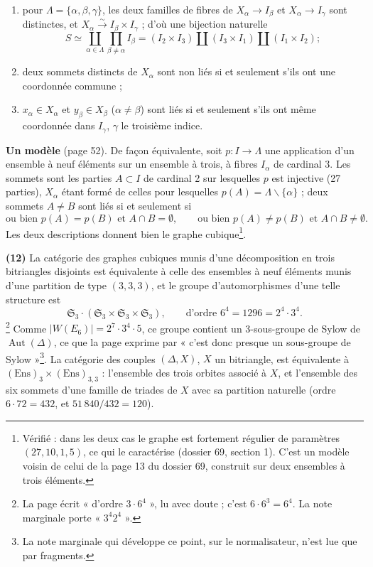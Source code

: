 \documentclass[11pt,a4paper]{article}
\begin{document}
\begin{enumerate}
\item[a)] pour $\Lambda = \lbrace \alpha, \beta, \gamma\rbrace$, les deux familles
  de fibres de $X_\alpha \to I_\beta$ et $X_\alpha \to I_\gamma$ sont distinctes,
  et $X_\alpha \xrightarrow{\sim} I_\beta \times I_\gamma$ ; d'où une bijection
  naturelle
  \[
  S \simeq \coprod_{\alpha \in \Lambda} \prod_{\beta \neq \alpha} I_\beta =
  (I_2 \times I_3) \amalg (I_3 \times I_1) \amalg (I_1 \times I_2) ;
  \]
\item[c)] deux sommets distincts de $X_\alpha$ sont non liés si et seulement
  s'ils ont une coordonnée commune ;
\item[d)] $x_\alpha \in X_\alpha$ et $y_\beta \in X_\beta$ ($\alpha \neq \beta$)
  sont liés si et seulement s'ils ont même coordonnée dans $I_\gamma$, $\gamma$
  le troisième indice.
\end{enumerate}

\textbf{Un modèle} (page 52). De façon équivalente, soit $p : I \to \Lambda$
une application d'un ensemble à neuf éléments sur un ensemble à trois, à fibres
$I_\alpha$ de cardinal 3. Les sommets sont les parties $A \subset I$ de
cardinal 2 sur lesquelles $p$ est injective (27 parties), $X_\alpha$ étant
formé de celles pour lesquelles $p(A) = \Lambda \smallsetminus \lbrace
\alpha\rbrace$ ; deux sommets $A \neq B$ sont liés si et seulement si
\[
\text{ou bien } p(A) = p(B) \text{ et } A \cap B = \emptyset, \qquad \text{ou
bien } p(A) \neq p(B) \text{ et } A \cap B \neq \emptyset .
\]
Les deux descriptions donnent bien le graphe cubique\footnote{Vérifié : dans
les deux cas le graphe est fortement régulier de paramètres $(27, 10, 1, 5)$, ce
qui le caractérise (dossier 69, section 1). C'est un modèle voisin de celui de
la page 13 du dossier 69, construit sur deux ensembles à trois éléments.}.

\textbf{(12)} La catégorie des graphes cubiques munis d'une décomposition en
trois bitriangles disjoints est équivalente à celle des ensembles à neuf
éléments munis d'une partition de type $(3, 3, 3)$, et le groupe
d'automorphismes d'une telle structure est
\[
\mathfrak{S}_3 \cdot (\mathfrak{S}_3 \times \mathfrak{S}_3 \times
\mathfrak{S}_3), \qquad \text{d'ordre } 6^4 = 1296 = 2^4 \cdot 3^4 .
\]\footnote{La page
écrit « d'ordre $3 \cdot 6^4$ », lu avec doute ; c'est $6 \cdot 6^3 = 6^4$. La
note marginale porte « $3^4 2^4$ ».}
Comme $|W(E_6)| = 2^7 \cdot 3^4 \cdot 5$, ce groupe contient un 3-sous-groupe
de Sylow de $\operatorname{Aut}(\Delta)$, ce que la page exprime par « c'est
donc presque un sous-groupe de Sylow »\footnote{La note marginale qui
développe ce point, sur le normalisateur, n'est lue que par fragments.}. La
catégorie des couples $(\Delta, X)$, $X$ un bitriangle, est équivalente à
$(\mathrm{Ens})_3 \times (\mathrm{Ens})_{3,3}$ : l'ensemble des trois orbites
associé à $X$, et l'ensemble des six sommets d'une famille de triades de $X$
avec sa partition naturelle (ordre $6 \cdot 72 = 432$, et $51\,840 / 432 =
120$).
\end{document}
